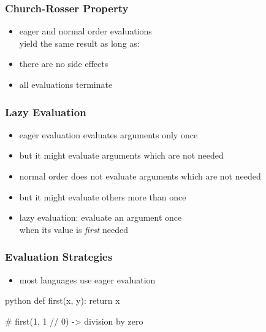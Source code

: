 \documentclass[dvipsnames]{beamer}
\theoremstyle{plain}
\begin{document}
\begin{frame}
  \frametitle{Church-Rosser Property}

  \begin{itemize}
    \item eager and normal order evaluations\\
      yield the same result as long as:

    \bigskip
    \item there are no side effects
    \item all evaluations terminate
  \end{itemize}
\end{frame}

\begin{frame}
  \frametitle{Lazy Evaluation}

  \begin{itemize}
    \item eager evaluation evaluates arguments only once
    \item but it might evaluate arguments which are not needed

    \pause
    \medskip
    \item normal order does not evaluate arguments which are not needed
    \item but it might evaluate others more than once

    \pause
    \medskip
    \item \alert{lazy evaluation}: evaluate an argument once\\
      when its value is \emph{first} needed
  \end{itemize}
\end{frame}

\begin{frame}[fragile]
  \frametitle{Evaluation Strategies}

  \begin{itemize}
    \item most languages use eager evaluation
  \end{itemize}

  \begin{example}[Python]
    \begin{pygments}{python}
def first(x, y):
    return x

# first(1, 1 // 0) -> division by zero
    \end{pygments}
  \end{example}
\end{frame}
\end{document}

